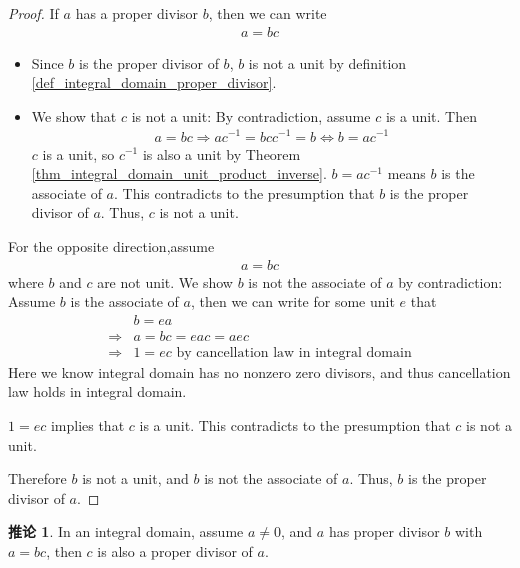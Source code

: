 \documentclass[utf8]{ctexbook}
\theoremstyle{definition}
\newtheorem{corollary}{推论}[section]
\begin{document}
\begin{proof}
If $a$ has a proper divisor $b$, then we can write
\begin{align*}
a = bc
\end{align*}
\begin{itemize}
\item{Since $b$ is the proper divisor of $b$, $b$ is not a unit by definition \ref{def_integral_domain_proper_divisor}. }
\item{We show that $c$ is not a unit: By contradiction, assume $c$ is a unit. Then 
\begin{align*}
a = bc \Longrightarrow a c^{-1} = b c c^{-1} = b \Longleftrightarrow b = a c^{-1}
\end{align*} 
$c$ is a unit, so $c^{-1}$ is also a unit by Theorem  \ref{thm_integral_domain_unit_product_inverse}. $b = a c^{-1}$ means $b$ is the associate of $a$. This contradicts to the presumption that $b$ is the proper divisor of $a$. Thus, $c$ is not a unit.}
\end{itemize}

For the opposite direction,assume
\begin{align*}
a = bc
\end{align*}
where $b$ and $c$ are not unit. We show $b$ is not the associate of $a$ by contradiction: Assume $b$ is the associate of $a$, then we can write for some unit $e$ that
\begin{align*}
& b = e a \\
 \Longrightarrow & a = bc = e a c = a ec \\
\Longrightarrow & 1 = ec \mbox{ by cancellation law in integral domain}
\end{align*}
Here we know integral domain has no nonzero zero divisors, and thus cancellation law holds in integral domain.

$1 = ec $ implies that $c$ is a unit. This contradicts to the presumption that $c$ is not a unit.

Therefore $b$ is not a unit, and $b$ is not the associate of $a$. Thus, $b$ is the proper divisor of $a$.
\end{proof}

\begin{corollary}\label{corollary_integral_domain_proper_divisor_redef}
In an integral domain, assume $a \neq 0$, and $a$ has proper divisor $b$ with $a = bc$, then $c$ is also a proper divisor of $a$.
\end{corollary}
\end{document}
